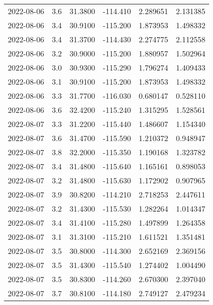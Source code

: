 \begin{tabular}{lrrrrr}
2022-08-06 &       3.6 &  31.3800 &  -114.410 &         2.289651 &         2.131385 \\
2022-08-06 &       3.4 &  30.9100 &  -115.200 &         1.873953 &         1.498332 \\
2022-08-06 &       3.4 &  31.3700 &  -114.430 &         2.274775 &         2.112558 \\
2022-08-06 &       3.2 &  30.9000 &  -115.200 &         1.880957 &         1.502964 \\
2022-08-06 &       3.0 &  30.9300 &  -115.290 &         1.796274 &         1.409433 \\
2022-08-06 &       3.1 &  30.9100 &  -115.200 &         1.873953 &         1.498332 \\
2022-08-06 &       3.3 &  31.7700 &  -116.030 &         0.680147 &         0.528110 \\
2022-08-06 &       3.6 &  32.4200 &  -115.240 &         1.315295 &         1.528561 \\
2022-08-07 &       3.3 &  31.2200 &  -115.440 &         1.486607 &         1.154340 \\
2022-08-07 &       3.6 &  31.4700 &  -115.590 &         1.210372 &         0.948947 \\
2022-08-07 &       3.8 &  32.2000 &  -115.350 &         1.190168 &         1.323782 \\
2022-08-07 &       3.4 &  31.4800 &  -115.640 &         1.165161 &         0.898053 \\
2022-08-07 &       3.2 &  31.4800 &  -115.630 &         1.172902 &         0.907965 \\
2022-08-07 &       3.9 &  30.8200 &  -114.210 &         2.718253 &         2.447611 \\
2022-08-07 &       3.2 &  31.4300 &  -115.530 &         1.282264 &         1.014347 \\
2022-08-07 &       3.4 &  31.4100 &  -115.280 &         1.497899 &         1.264358 \\
2022-08-07 &       3.1 &  31.3100 &  -115.210 &         1.611521 &         1.351481 \\
2022-08-07 &       3.5 &  30.8000 &  -114.300 &         2.652169 &         2.369156 \\
2022-08-07 &       3.5 &  31.4300 &  -115.540 &         1.274402 &         1.004490 \\
2022-08-07 &       3.5 &  30.8300 &  -114.260 &         2.670300 &         2.397040 \\
2022-08-07 &       3.7 &  30.8100 &  -114.180 &         2.749127 &         2.479234 \\

\end{tabular}

